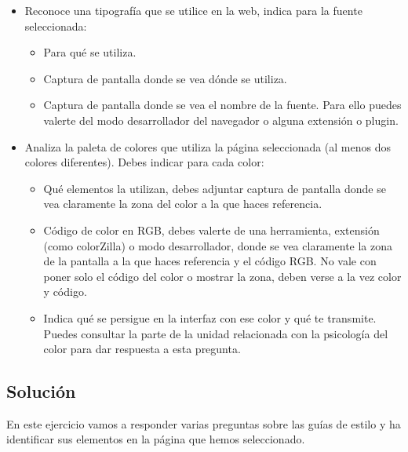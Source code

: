 \begin{enumerate}[label=\alph*)]
\begin{itemize}
        \item Reconoce una tipografía que se utilice en la web, indica para la fuente seleccionada:
        \begin{itemize}
            \item Para qué se utiliza.
            \item Captura de pantalla donde se vea dónde se utiliza.
            \item Captura de pantalla donde se vea el nombre de la fuente. Para ello puedes valerte del modo desarrollador del navegador o alguna extensión o plugin.
        \end{itemize}

        \item Analiza la paleta de colores que utiliza la página seleccionada (al menos dos colores diferentes). Debes indicar para cada color:
        \begin{itemize}
            \item Qué elementos la utilizan, debes adjuntar captura de pantalla donde se vea claramente la zona del color a la que haces referencia.
            \item Código de color en RGB, debes valerte de una herramienta, extensión (como colorZilla) o modo desarrollador, donde se vea claramente la zona de la pantalla a la que haces referencia y el código RGB. No vale con poner solo el código del color o mostrar la zona, deben verse a la vez color y código.
            \item Indica qué se persigue en la interfaz con ese color y qué te transmite. Puedes consultar la parte de la unidad relacionada con la psicología del color para dar respuesta a esta pregunta.
        \end{itemize}
    \end{itemize}
\end{enumerate}

\subsection{Solución}
En este ejercicio vamos a responder varias preguntas sobre las guías de estilo y ha identificar sus elementos en la página que hemos seleccionado.

